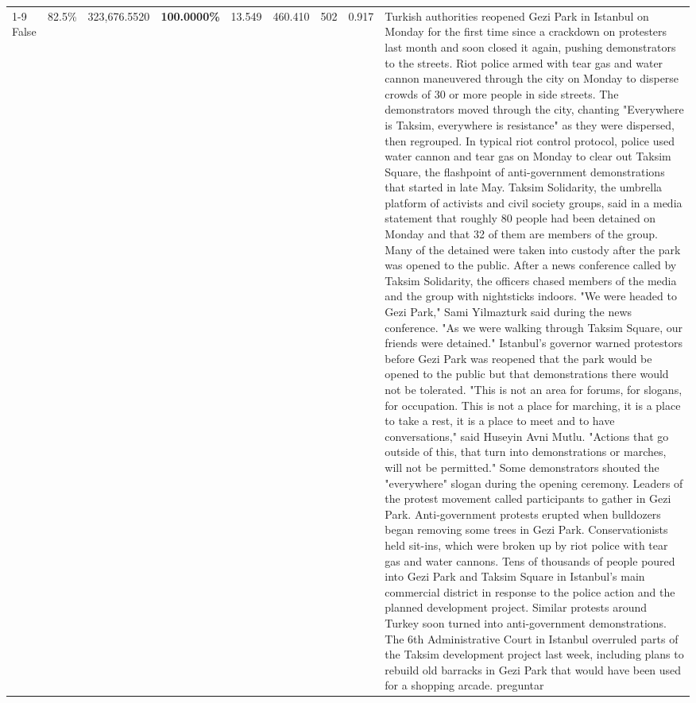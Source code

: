 \begin{table}[H]
\begin{tabular}{lllrlllll}
\cline{1-9}
False & 82.5\% & 323,676.5520 & \bfseries \color{red} 100.0000\% & 13.549 & 460.410 & 502 & 0.917 & Turkish authorities reopened Gezi Park in Istanbul on Monday for the first time since a crackdown on protesters last month and soon closed it again, pushing demonstrators to the streets. Riot police armed with tear gas and water cannon maneuvered through the city on Monday to disperse crowds of 30 or more people in side streets. The demonstrators moved through the city, chanting "Everywhere is Taksim, everywhere is resistance" as they were dispersed, then regrouped. In typical riot control protocol, police used water cannon and tear gas on Monday to clear out Taksim Square, the flashpoint of anti-government demonstrations that started in late May. Taksim Solidarity, the umbrella platform of activists and civil society groups, said in a media statement that roughly 80 people had been detained on Monday and that 32 of them are members of the group. Many of the detained were taken into custody after the park was opened to the public. After a news conference called by Taksim Solidarity, the officers chased members of the media and the group with nightsticks indoors. "We were headed to Gezi Park," Sami Yilmazturk said during the news conference. "As we were walking through Taksim Square, our friends were detained." Istanbul's governor warned protestors before Gezi Park was reopened that the park would be opened to the public but that demonstrations there would not be tolerated. "This is not an area for forums, for slogans, for occupation. This is not a place for marching, it is a place to take a rest, it is a place to meet and to have conversations," said Huseyin Avni Mutlu. "Actions that go outside of this, that turn into demonstrations or marches, will not be permitted." Some demonstrators shouted the "everywhere" slogan during the opening ceremony. Leaders of the protest movement called participants to gather in Gezi Park. Anti-government protests erupted when bulldozers began removing some trees in Gezi Park. Conservationists held sit-ins, which were broken up by riot police with tear gas and water cannons. Tens of thousands of people poured into Gezi Park and Taksim Square in Istanbul's main commercial district in response to the police action and the planned development project. Similar protests around Turkey soon turned into anti-government demonstrations. The 6th Administrative Court in Istanbul overruled parts of the Taksim development project last week, including plans to rebuild old barracks in Gezi Park that would have been used for a shopping arcade. preguntar \\

\end{tabular}
\end{table}
